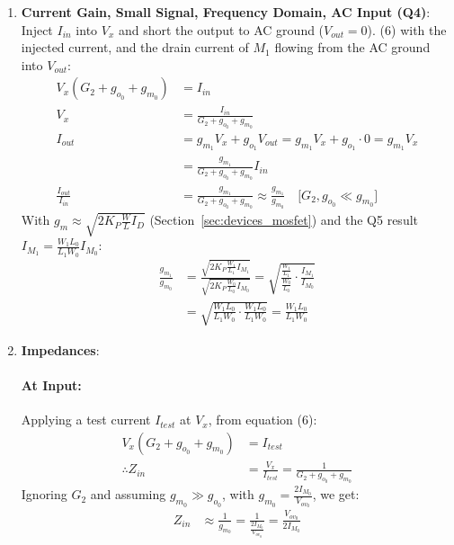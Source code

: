 \begin{enumerate}
\begin{align*}
      V_{OUT,\min} &= V_{ee} + V_{ov_1} \\
      V_{cc} - I_{M_1} R_L &\geq V_{OUT,\min} \\
      I_{M_1} R_L &\leq V_{cc} - V_{OUT,\min} \\
      R_{L, \max} &= \frac{V_{cc} - V_{OUT,\min}}{I_{M_1}} = \frac{V_{L,\max}}{I_{M_1}} \quad \text{[} V_{L,\max} = V_{cc} - V_{OUT,\min} \text{]}
    \end{align*}
  \item \textbf{Current Gain, Small Signal, Frequency Domain, AC Input (Q4)}:
    Inject \(I_{in}\) into \(V_x\) and short the output to AC ground
    (\(V_{out} = 0\)). (6) with the injected current, and the drain
    current of \(M_1\) flowing from the AC ground into \(V_{out}\):
    \begin{align*}
      V_{x}(G_2 + g_{o_0} + g_{m_0}) &= I_{in} \\
      V_{x} &= \frac{I_{in}}{G_2 + g_{o_0} + g_{m_0}} \\
      I_{out} &= g_{m_1} V_x + g_{o_1} V_{out} = g_{m_1} V_x + g_{o_1} \cdot 0 = g_{m_1} V_x \\
              &= \frac{g_{m_1}}{G_2 + g_{o_0} + g_{m_0}} I_{in} \\
      \frac{I_{out}}{I_{in}} &= \frac{g_{m_1}}{G_2 + g_{o_0} + g_{m_0}} \approx \frac{g_{m_1}}{g_{m_0}} \quad \text{[} G_2, g_{o_0} \ll g_{m_0} \text{]}
    \end{align*}
    With \(g_m \approx \sqrt{2 K_P \frac{W}{L} I_D}\)
    (Section~\ref{sec:devices_mosfet}) and the Q5 result
    \(I_{M_1} = \frac{W_1 L_0}{L_1 W_0} I_{M_0}\):
    \begin{align*}
      \frac{g_{m_1}}{g_{m_0}} &= \frac{\sqrt{2K_P \frac{W_1}{L_1} I_{M_1}}}{\sqrt{2K_P \frac{W_0}{L_0} I_{M_0}}}
                               = \sqrt{\frac{\frac{W_1}{L_1}}{\frac{W_0}{L_0}} \cdot \frac{I_{M_1}}{I_{M_0}}} \\
                              &= \sqrt{\frac{W_1 L_0}{L_1 W_0} \cdot \frac{W_1 L_0}{L_1 W_0}} = \frac{W_1 L_0}{L_1 W_0}
    \end{align*}
  \item \textbf{Impedances}:
    \paragraph{At Input:} Applying a test current $I_{test}$
      at $V_{x}$, from equation (6):
      \begin{align*}
        V_{x}(G_2 + g_{o_0} + g_{m_0}) &= I_{test} \\
        \therefore Z_{in} &= \frac{V_{x}}{I_{test}} = \frac{1}{G_2 + g_{o_0} + g_{m_0}}
      \end{align*}
      Ignoring $G_2$ and assuming $g_{m_0} \gg g_{o_0}$, with
      \(g_{m_0} = \frac{2 I_{M_0}}{V_{ov_0}}\), we get:
      \begin{align*}
        Z_{in} &\approx \frac{1}{g_{m_0}} = \frac{1}{\frac{2 I_{M_0}}{V_{ov_0}}} = \frac{V_{ov_0}}{2 I_{M_0}}
      \end{align*}

\end{enumerate}

